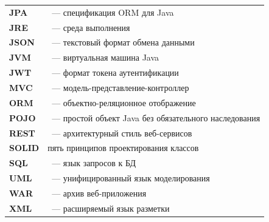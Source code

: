 \begin{longtable}{L{2.6cm}L{13.2cm}}
\textbf{JPA} & ~--- спецификация ORM для Java \\[2pt]
\textbf{JRE} & ~--- среда выполнения \\[2pt]
\textbf{JSON} & ~--- текстовый формат обмена
   данными \\[2pt]
\textbf{JVM} & ~--- виртуальная машина Java \\[2pt]
\textbf{JWT} & ~--- формат токена аутентификации \\[2pt]
\textbf{MVC} & ~--- модель-представление-контроллер \\[2pt]
\textbf{ORM} & ~--- объектно-реляционное
   отображение \\[2pt]
\textbf{POJO} & ~--- простой объект Java без
   обязательного наследования \\[2pt]
\textbf{REST} & ~--- архитектурный стиль
   веб-сервисов \\[2pt]
\textbf{SOLID} & пять принципов проектирования классов \\[2pt]
\textbf{SQL} & ~--- язык запросов к БД \\[2pt]
\textbf{UML} & ~--- унифицированный язык
   моделирования \\[2pt]
\textbf{WAR} & ~--- архив веб-приложения \\[2pt]
\textbf{XML} & ~--- расширяемый язык разметки \\
\end{longtable}

